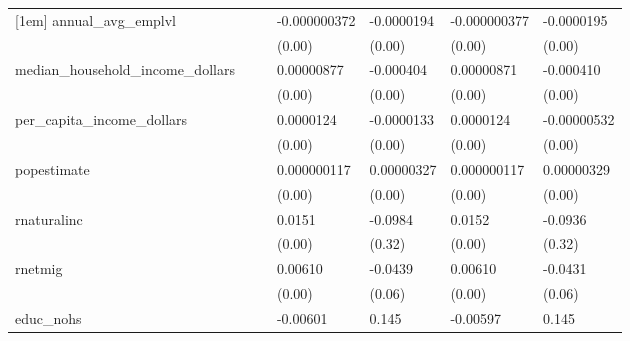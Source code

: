 {\begin{longtable}{|l|ll|ll|ll|}
            [1em]
            annual\_avg\_emplvl&                     &                     &-0.000000372\sym{***}&  -0.0000194\sym{**} &-0.000000377\sym{***}&  -0.0000195\sym{**} \\
                        &                     &                     &      (0.00)         &      (0.00)         &      (0.00)         &      (0.00)         \\
            [1em]
            median\_household\_income\_dollars&                     &                     &  0.00000877\sym{***}&   -0.000404\sym{***}&  0.00000871\sym{***}&   -0.000410\sym{***}\\
                        &                     &                     &      (0.00)         &      (0.00)         &      (0.00)         &      (0.00)         \\
            [1em]
            per\_capita\_income\_dollars&                     &                     &   0.0000124\sym{***}&  -0.0000133         &   0.0000124\sym{***}& -0.00000532         \\
                        &                     &                     &      (0.00)         &      (0.00)         &      (0.00)         &      (0.00)         \\
            [1em]
            popestimate &                     &                     & 0.000000117\sym{***}&  0.00000327         & 0.000000117\sym{***}&  0.00000329         \\
                        &                     &                     &      (0.00)         &      (0.00)         &      (0.00)         &      (0.00)         \\
            [1em]
            rnaturalinc &                     &                     &      0.0151\sym{**} &     -0.0984         &      0.0152\sym{**} &     -0.0936         \\
                        &                     &                     &      (0.00)         &      (0.32)         &      (0.00)         &      (0.32)         \\
            [1em]
            rnetmig     &                     &                     &     0.00610\sym{***}&     -0.0439         &     0.00610\sym{***}&     -0.0431         \\
                        &                     &                     &      (0.00)         &      (0.06)         &      (0.00)         &      (0.06)         \\
            [1em]
            educ\_nohs   &                     &                     &    -0.00601\sym{***}&       0.145         &    -0.00597\sym{***}&       0.145         \\

\end{longtable}}
